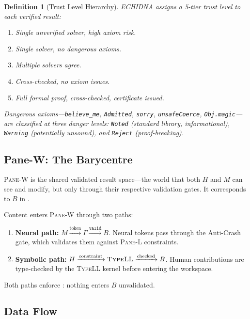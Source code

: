 \documentclass[11pt,a4paper]{article}
\newtheorem{definition}{Definition}[section]
\newcommand{\paneL}{\textsc{Pane-L}}
\newcommand{\paneW}{\textsc{Pane-W}}
\newcommand{\typell}{\textsc{TypeLL}}
\begin{document}
\begin{definition}[Trust Level Hierarchy]\label{def:trust}
ECHIDNA assigns a 5-tier trust level to each verified result:
\begin{enumerate}
  \item[\textbf{L1}] Single unverified solver, high axiom risk.
  \item[\textbf{L2}] Single solver, no dangerous axioms.
  \item[\textbf{L3}] Multiple solvers agree.
  \item[\textbf{L4}] Cross-checked, no axiom issues.
  \item[\textbf{L5}] Full formal proof, cross-checked, certificate issued.
\end{enumerate}
Dangerous axioms---\texttt{believe\_me}, \texttt{Admitted},
\texttt{sorry}, \texttt{unsafeCoerce}, \texttt{Obj.magic}---are
classified at three danger levels: \texttt{Noted} (standard
library, informational), \texttt{Warning} (potentially unsound),
and \texttt{Reject} (proof-breaking).
\end{definition}

\subsection{Pane-W: The Barycentre}

\paneW{} is the shared validated result space---the world that both
$H$ and $M$ can see and modify, but only through their respective
validation gates. It corresponds to $B$ in .

Content enters \paneW{} through two paths:
\begin{enumerate}
  \item \textbf{Neural path:} $M \xrightarrow{\text{token}} \Gamma
    \xrightarrow{\texttt{Valid}} B$. Neural tokens pass through the
    Anti-Crash gate, which validates them against \paneL{} constraints.
  \item \textbf{Symbolic path:} $H \xrightarrow{\text{constraint}}
    \typell{} \xrightarrow{\text{checked}} B$. Human contributions
    are type-checked by the \typell{} kernel before entering the
    workspace.
\end{enumerate}

Both paths enforce : nothing enters $B$ unvalidated.

\subsection{Data Flow}
\end{document}
